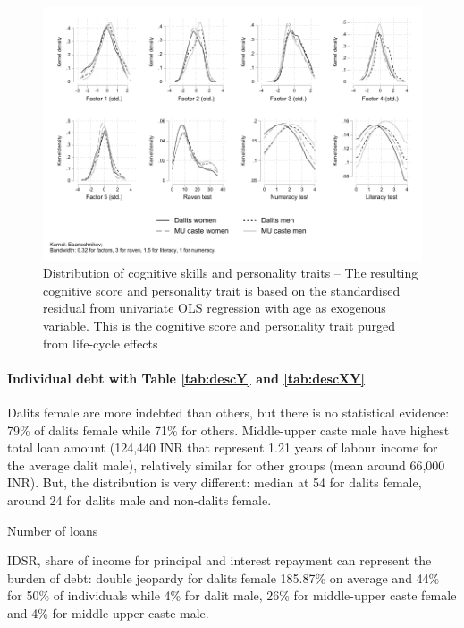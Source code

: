 \documentclass[a4paper, 11pt, onecolumn]{article}
\begin{document}

\begin{figure}[ht]
\raggedright
\includegraphics[width=\textwidth]{INPUT/Kernel_perso}
\caption{Distribution of cognitive skills and personality traits -- The resulting cognitive score and personality trait is based on the standardised residual from univariate OLS regression with age as exogenous variable. This is the cognitive score and personality trait purged from life-cycle effects}
\label{fig:EGOscore}
\end{figure}



\paragraph{Individual debt with Table \ref{tab:descY} and \ref{tab:descXY}}

Dalits female are more indebted than others, but there is no statistical evidence: 79\% of dalits female while 71\% for others.
Middle-upper caste male have highest total loan amount (124,440 INR that represent 1.21 years of labour income for the average dalit male), relatively similar for other groups (mean around 66,000 INR).
But, the distribution is very different: median at 54 for dalits female, around 24 for dalits male and non-dalits female.

Number of loans 

IDSR, share of income for principal and interest repayment can represent the burden of debt: double jeopardy for dalits female 185.87\% on average and 44\% for 50\% of individuals while 4\% for dalit male, 26\% for middle-upper caste female and 4\% for middle-upper caste male.
\end{document}
